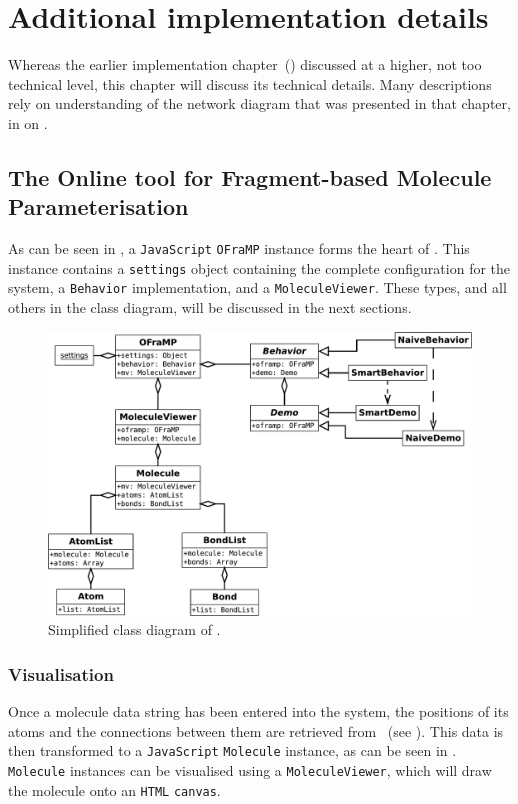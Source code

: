 \chapter[Additional implementation]{Additional implementation details}

Whereas the earlier implementation chapter~() discussed \oframp{} at a higher, not too technical level, this chapter will discuss its technical details. Many descriptions rely on understanding of the network diagram that was presented in that chapter, in  on .



\section[\oframp]{The Online tool for Fragment-based Molecule Parameterisation}
As can be seen in , a \verb|JavaScript| \verb|OFraMP| instance forms the heart of \oframp. This instance contains a \verb|settings| object containing the complete configuration for the system, a \verb|Behavior| implementation, and a \verb|MoleculeViewer|. These types, and all others in the class diagram, will be discussed in the next sections.

\begin{figure}
\center
\includegraphics[width=\textwidth]{img/oframp_class.pdf}
\caption{Simplified class diagram of \oframp.}
\end{figure}


\subsection{Visualisation}
Once a molecule data string has been entered into the system, the positions of its atoms and the connections between them are retrieved from \oapoc~(see ). This data is then transformed to a \verb|JavaScript| \verb|Molecule| instance, as can be seen in . \verb|Molecule| instances can be visualised using a \verb|MoleculeViewer|, which will draw the molecule onto an \verb|HTML| \verb|canvas|.


